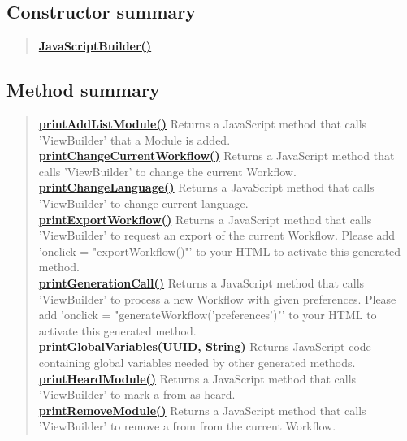 \documentclass[11pt,a4paper]{report}
\begin{document}
{{{{{{{{{{{{{{			\subsection{Constructor summary}{
				\begin{verse}
					\hyperlink{studyplanning.view.JavaScriptBuilder()}{{\bf JavaScriptBuilder()}} \\
				\end{verse}
			}
				
			\subsection{Method summary}{
				\begin{verse}
					\hyperlink{studyplanning.view.JavaScriptBuilder.printAddListModule()}{{\bf printAddListModule()}} Returns a JavaScript method that calls 'ViewBuilder' that a Module is added.\\
					\hyperlink{studyplanning.view.JavaScriptBuilder.printChangeCurrentWorkflow()}{{\bf printChangeCurrentWorkflow()}} Returns a JavaScript method that calls 'ViewBuilder' to change the current Workflow.\\
					\hyperlink{studyplanning.view.JavaScriptBuilder.printChangeLanguage()}{{\bf printChangeLanguage()}} Returns a JavaScript method that calls 'ViewBuilder' to change current language.\\
					\hyperlink{studyplanning.view.JavaScriptBuilder.printExportWorkflow()}{{\bf printExportWorkflow()}} Returns a JavaScript method that calls 'ViewBuilder' to request an export of the current Workflow. Please add 'onclick = "exportWorkflow()"' to your HTML to activate this generated method.\\
					\hyperlink{studyplanning.view.JavaScriptBuilder.printGenerationCall()}{{\bf printGenerationCall()}} Returns a JavaScript method that calls 'ViewBuilder' to process a new Workflow with given preferences. Please add 'onclick = "generateWorkflow('preferences')"' to your HTML to activate this generated method.\\
					\hyperlink{studyplanning.view.JavaScriptBuilder.printGlobalVariables(java.util.UUID, java.lang.String)}{{\bf printGlobalVariables(UUID, String)}} Returns JavaScript code containing global variables needed by other generated methods.\\
					\hyperlink{studyplanning.view.JavaScriptBuilder.printHeardModule()}{{\bf printHeardModule()}} Returns a JavaScript method that calls 'ViewBuilder' to mark a from as heard.\\
					\hyperlink{studyplanning.view.JavaScriptBuilder.printRemoveModule()}{{\bf printRemoveModule()}} Returns a JavaScript method that calls 'ViewBuilder' to remove a from from the current Workflow.\\
				\end{verse}
			}
			
}}}}}}}}}}}}}}
\end{document}

